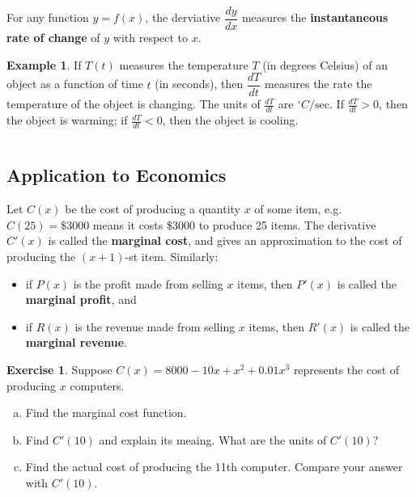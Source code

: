 \documentclass[11pt,reqno,final]{amsart}
\numberwithin{figure}{section}
\theoremstyle{definition} %
\newtheorem{example}[equation]{Example}%
\newtheorem{exercise}[question]{Exercise}
\begin{document}
\begin{framed}
        For any function $y = f(x)$, the derviative $\dfrac{dy}{dx}$ measures the
        \textbf{instantaneous rate of change} of $y$ with respect to $x$.
\end{framed}

\begin{example}
        If $T(t)$ measures the temperature $T$ (in degrees Celsius) of an object as a function of time $t$ (in seconds),
        then $\dfrac{dT}{dt}$ measures the rate the temperature of the object is changing.
        The units of $\frac{dT}{dt}$ are $^\circ C/\mathrm{sec}$.
        If $\frac{dT}{dt} > 0$, then the object is warming;
        if $\frac{dT}{dt} < 0$, then the object is cooling.
\end{example}

$ $

\subsection{Application to Economics}
Let $C(x)$ be the cost of producing a quantity $x$ of some item,
e.g. $C(25) = \$ 3000$ means it costs \$3000 to produce 25 items.
The derivative $C'(x)$ is called the \textbf{marginal cost}, and gives an approximation to the cost of producing the $(x+1)$-st item.
Similarly:
\begin{itemize}
\item if $P(x)$ is the profit made from selling $x$ items, then $P'(x)$ is called the \textbf{marginal profit}, and
\item if $R(x)$ is the revenue made from selling $x$ items, then $R'(x)$ is called the \textbf{marginal revenue}.
\end{itemize}

\begin{exercise}
        Suppose $C(x) = 8000-10x+x^2 + 0.01x^3$ represents the cost of producing $x$ computers.
        \begin{enumerate}[(a)]
        \item Find the marginal cost function.
                \vfill
        \item Find $C'(10)$ and explain its meaing. What are the units of $C'(10)$?
                \vfill
        \item Find the actual cost of producing the 11th computer. Compare your answer with $C'(10)$.
                \vfill
        \end{enumerate}
\end{exercise}
\end{document}
